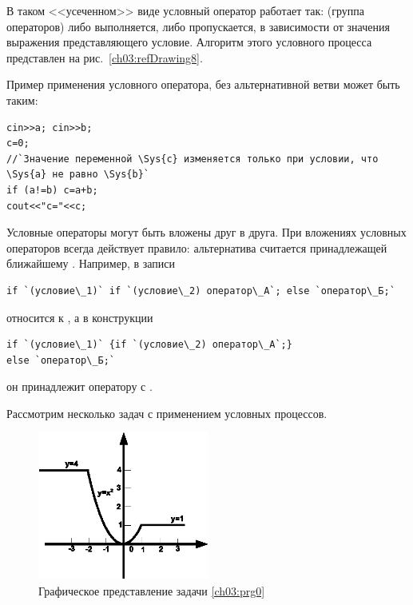 В таком <<усеченном>> виде условный оператор работает так:  (группа операторов) либо
выполняется, либо пропускается, в зависимости от значения выражения представляющего условие. Алгоритм этого условного
процесса представлен на рис.~\ref{ch03:refDrawing8}.



Пример применения условного оператора, без альтернативной ветви  может быть таким:

\begin{lstlisting}
cin>>a; cin>>b;
c=0;
//`Значение переменной \Sys{c} изменяется только при условии, что \Sys{a} не равно \Sys{b}`
if (a!=b) c=a+b;
cout<<"c="<<c;
\end{lstlisting}

Условные операторы могут быть вложены друг в друга. При вложениях условных операторов всегда действует правило:
альтернатива  считается принадлежащей ближайшему . Например, в записи
\begin{lstlisting}
if `(условие\_1)` if `(условие\_2) оператор\_А`; else `оператор\_Б;`
\end{lstlisting}
 относится к , а в конструкции
\begin{lstlisting}
if `(условие\_1)` {if `(условие\_2) оператор\_А`;} 
else `оператор\_Б;`
\end{lstlisting}
он принадлежит оператору  с . 

Рассмотрим несколько задач с применением условных процессов.


\begin{figure}[htb]
\begin{center}
\includegraphics[width=0.5\textwidth]{img/ris_3_10}
\caption{Графическое представление задачи \ref{ch03:prg0}}
\label{ch03:refDrawing9}
\end{center}
\end{figure}

